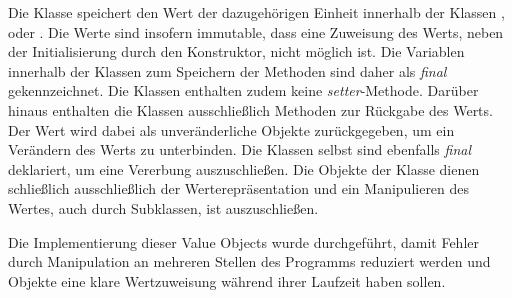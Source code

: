 Die Klasse \href{https://github.com/lucasmerkel/dhbw-advancedswe-programmentwurf/blob/5764d7da4cfd0562ed8e96128e92f85c30b7309d/swe_programmentwurf/consumergoods-inventory-planner/4-cip-abstractioncode/src/main/java/de/dhbw/cip/abstractioncode/Value.java}{} speichert den Wert der dazugehörigen Einheit innerhalb der Klassen \href{https://github.com/lucasmerkel/dhbw-advancedswe-programmentwurf/blob/5764d7da4cfd0562ed8e96128e92f85c30b7309d/swe_programmentwurf/consumergoods-inventory-planner/4-cip-abstractioncode/src/main/java/de/dhbw/cip/abstractioncode/Volume.java}{}, \href{https://github.com/lucasmerkel/dhbw-advancedswe-programmentwurf/blob/5764d7da4cfd0562ed8e96128e92f85c30b7309d/swe_programmentwurf/consumergoods-inventory-planner/4-cip-abstractioncode/src/main/java/de/dhbw/cip/abstractioncode/Quantity.java}{} oder \href{https://github.com/lucasmerkel/dhbw-advancedswe-programmentwurf/blob/5764d7da4cfd0562ed8e96128e92f85c30b7309d/swe_programmentwurf/consumergoods-inventory-planner/4-cip-abstractioncode/src/main/java/de/dhbw/cip/abstractioncode/Weight.java}{}.
Die Werte sind insofern immutable, dass eine Zuweisung des Werts, neben der Initialisierung durch den Konstruktor, nicht möglich ist.
Die Variablen innerhalb der Klassen zum Speichern der Methoden sind daher als \textit{final} gekennzeichnet.
Die Klassen enthalten zudem keine \textit{setter}-Methode.
Darüber hinaus enthalten die Klassen ausschließlich Methoden zur Rückgabe des Werts.
Der Wert wird dabei als unveränderliche Objekte zurückgegeben, um ein Verändern des Werts zu unterbinden.
Die Klassen selbst sind ebenfalls \textit{final} deklariert, um eine Vererbung auszuschließen.
Die Objekte der Klasse dienen schließlich ausschließlich der Werterepräsentation und ein Manipulieren des Wertes, auch durch Subklassen, ist auszuschließen.

Die Implementierung dieser Value Objects wurde durchgeführt, damit Fehler durch Manipulation an mehreren Stellen des Programms reduziert werden und Objekte eine klare Wertzuweisung während ihrer Laufzeit haben sollen.

